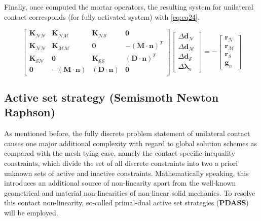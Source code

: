 \documentclass[a4paper,10pt]{article} %
\begin{document}
Finally, once computed the mortar operators, the resulting system for unilateral contact corresponds (for fully activated system) with \eqref{eq:eq24}.

\begin{equation}\label{eq:eq24}
 \left[ \begin{array}{cccc} \mathbf{K}_{\mathcal{N}\mathcal{N}} &  \mathbf{K}_{\mathcal{N}\mathcal{M}} & \mathbf{K}_{\mathcal{N}\mathcal{S}} & \mathbf{0} \\ \mathbf{K}_{\mathcal{N}\mathcal{N}}  & \mathbf{K}_{\mathcal{M}\mathcal{M}} & \mathbf{0} & -(\mathbf{M}\cdot \mathbf{n})^{T} \\ \mathbf{K}_{\mathcal{S}\mathcal{N}} & \mathbf{0} & \mathbf{K}_{\mathcal{S}\mathcal{S}} & (\mathbf{D}\cdot \mathbf{n})^T \\ \mathbf{0} & -(\mathbf{M}\cdot \mathbf{n}) & (\mathbf{D}\cdot \mathbf{n}) & \mathbf{0}   \end{array} \right] \left[ \begin{array}{c} \Delta\mathbf{d}_{\mathcal{N}} \\ \Delta\mathbf{d}_{\mathcal{M}} \\ \Delta\mathbf{d}_{\mathcal{S}} \\ \Delta\boldsymbol{\lambda}_n \end{array} \right] = - \left[ \begin{array}{c} \mathbf{r}_{\mathcal{N}} \\ \mathbf{r}_{\mathcal{M}} \\ \mathbf{r}_{\mathcal{S}} \\ \mathbf{g}_n \end{array} \right] 
\end{equation}

\subsection{Active set strategy (Semismoth Newton Raphson)}

As mentioned before, the fully discrete problem statement of unilateral contact causes one major additional complexity with regard to global solution schemes as compared with the mesh tying case, namely the contact specific inequality constraints, which divide the set of all discrete constraints into two a priori unknown sets of active and inactive constraints. Mathematically speaking, this introduces an additional source of non-linearity apart from the well-known geometrical and material non-linearities of non-linear solid mechanics. To resolve this contact non-linearity, so-called primal-dual active set strategies (\textbf{PDASS}) will be employed.
\end{document}
